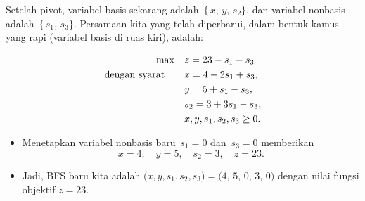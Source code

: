 \begin{tcolorbox}[colback=algopt!6, colframe=algopt, coltitle=white, fonttitle=\bfseries, sharp corners, title={\ding{52}\ Optimal: Kamus Akhir}]

Setelah pivot, variabel basis sekarang adalah
\(\,\{\,x,\,y,\,s_2\}\), 
dan variabel nonbasis adalah 
\(\,\{\,s_1,\,s_3\}\).  
Persamaan kita yang telah diperbarui, dalam bentuk kamus yang rapi (variabel basis di ruas kiri), adalah:

\[
\begin{aligned}
\max\quad 
& z = 23 - s_1 - s_3 \\
\mbox{dengan syarat}\quad\quad 
& x = 4 - 2s_1 + s_3, \\
& y = 5 + s_1 - s_3, \\
& s_2 = 3 + 3s_1 - s_3, \\
& x, y, s_1, s_2, s_3 \geq 0.
\end{aligned}
\]

\begin{itemize}
  \item Menetapkan variabel nonbasis baru \(\,s_1=0\) dan \(\,s_3=0\) memberikan
  \[
  x=4, \quad y=5,\quad s_2=3,\quad z=23.
  \]
  \item Jadi, BFS baru kita adalah 
  \(\bigl(x,y,s_1,s_2,s_3\bigr)=\bigl(4,\,5,\,0,\,3,\,0\bigr)\) 
  dengan nilai fungsi objektif \(z=23\).
\end{itemize}
\end{tcolorbox}

